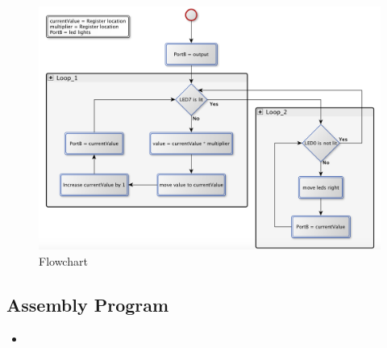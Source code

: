 \documentclass[a4paper, 12pt]{article}
\newcommand{\avrasm}[2]{
\begin{itemize}
\item[]
\end{itemize}
}
\begin{document}
\begin{figure}[h!]
\includegraphics[scale=0.5]{Flowchart_pics/assignment6_pic.png} 
\caption{Flowchart}
\label{}
\end{figure}
\newpage



\subsection{Assembly Program}
\avrasm{../src/a6.asm}{}
\end{document}
